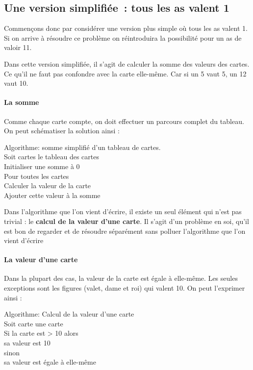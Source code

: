 \subsection{Une version simplifiée~: tous les as valent 1}

Commençons donc par considérer une version plus simple où tous les as valent 1.
Si on arrive à résoudre ce problème on réintroduira la possibilité pour un as
de valoir 11.

Dans cette version simplifiée, il s'agit de calculer la somme des valeurs des
cartes. Ce qu'il ne faut pas confondre avec la carte elle-même. Car si un
5 vaut 5, un 12 vaut 10.

\paragraph{La somme}

Comme chaque carte compte, on doit effectuer un parcours complet du
tableau. On peut schématiser la solution ainsi :

\begin{langagenaturel}
Algorithme: somme simplifié d'un tableau de cartes.\\

Soit cartes le tableau des cartes\\
Initialiser une somme à 0\\
Pour toutes les cartes \\
	\tab  Calculer la valeur de la carte\\
	\tab Ajouter cette valeur à la somme\\
\end{langagenaturel}

Dans l'algorithme que l'on vient d'écrire, il existe un seul élément qui
n'est pas trivial : le \textbf{calcul de la valeur d'une carte}. Il s'agit d'un
problème en soi, qu'il est bon de regarder et de résoudre séparément
sans polluer l'algorithme que l'on vient d'écrire

\paragraph{La valeur d'une carte}

Dans la plupart des cas, la valeur de la carte est égale à elle-même.
Les seules exceptions sont les figures (valet, dame et roi) qui valent
10. On peut l'exprimer ainsi :

\begin{langagenaturel}
Algorithme: Calcul de la valeur d'une carte\\

Soit carte une carte\\
Si la carte est > 10 alors\\
    \tab sa valeur est 10\\
sinon\\
    \tab sa valeur est égale à elle-même\\
\end{langagenaturel}

